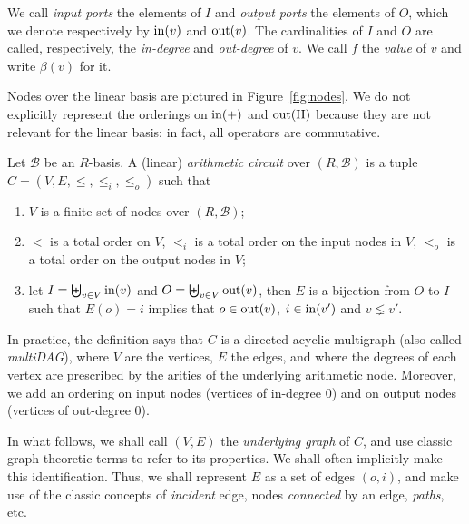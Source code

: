 We call \emph{input ports} the elements of $I$
and \emph{output ports} the elements of $O$,
which we denote respectively by
$\operatorname{in}(v)$ and
$\operatorname{out}(v)$. The cardinalities of $I$ and $O$ are called, respectively,
the \emph{in-degree} and \emph{out-degree} of $v$.
We call $f$ the \emph{value} of $v$ and write
$\beta(v)$ for it.

Nodes over the linear basis are pictured in Figure~\ref{fig:nodes}. We
do not explicitly represent the orderings on $\operatorname{in}(+)$ and
$\operatorname{out}(\operatorname{H})$ because they are not relevant for the linear basis: in
fact, all operators are commutative.

\begin{definition}
  Let $\mathcal{B}$ be an $R$-basis. A (linear)
  \emph{arithmetic circuit} over
  $(R,\mathcal{B})$ is a tuple $C=(V,E,\le,\le_i,\le_o)$ such that
  \begin{enumerate}
  \item $V$ is a finite set of nodes over $(R,\mathcal{B})$;
  \item $<$ is a total order on $V$, $<_i$ is a total order on the
    input nodes in $V$, $<_o$ is a total order on the output nodes in
    $V$;
  \item let $I=\biguplus_{v\in V}\operatorname{in}(v)$ and $O=\biguplus_{v\in
      V}\operatorname{out}(v)$, then $E$ is a bijection from $O$ to $I$ such that
    $E(o)=i$ implies that $o\in\operatorname{out}(v)$, $i\in\operatorname{in}(v')$ and $v\lneq
    v'$.
  \end{enumerate}
\end{definition}

In practice, the definition says that $C$ is a directed acyclic
multigraph (also called \emph{multiDAG}), where $V$
are the vertices, $E$ the edges, and where
the degrees of each vertex are prescribed by the
arities of the underlying arithmetic node. Moreover, we add an
ordering on input nodes (vertices of in-degree $0$) and on output
nodes (vertices of out-degree $0$). 

In what follows, we shall call $(V,E)$ the
\emph{underlying graph} of $C$, and use
classic graph theoretic terms to refer to its properties. We shall
often implicitly make this identification. Thus, we shall represent
$E$ as a set of edges $(o,i)$, and make use of the classic concepts of
\emph{incident} edge, nodes \emph{connected} by an edge,
\emph{paths}, etc.


